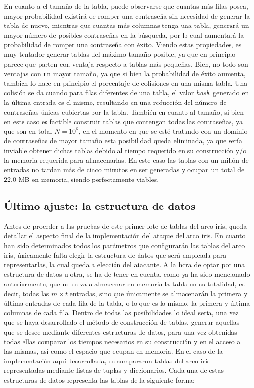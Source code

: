 \documentclass[12pt,spanish,listoffigures,listoftables,listofalgorithms]{tfgetsinf}
\newcommand{\hash}{\textit{hash}}
\begin{document}
En cuanto a el tamaño de la tabla, puede observarse que cuantas más filas posea, mayor probabilidad existirá de romper una contraseña sin necesidad de generar la tabla de nuevo, mientras que cuantas más columnas tenga una tabla, generará un mayor número de posibles contraseñas en la búsqueda, por lo cual aumentará la probabilidad de romper una contraseña con éxito. Viendo estas propiedades, es muy tentador generar tablas del máximo tamaño posible, ya que en principio parece que parten con ventaja respecto a tablas más pequeñas. Bien, no todo son ventajas con un mayor tamaño, ya que si bien la probabilidad de éxito aumenta, también lo hace en principio el porcentaje de colisiones en una misma tabla. Una colisión se da cuando para filas diferentes de una tabla, el valor \hash~generado en la última entrada es el mismo, resultando en una reducción del número de contraseñas únicas cubiertas por la tabla. También en cuanto al tamaño, si bien en este caso es factible construir tablas que contengan todas las contraseñas, ya que son en total $N = 10^6$, en el momento en que se esté tratando con un dominio de contraseñas de mayor tamaño esta posibilidad queda eliminada, ya que sería inviable obtener dichas tablas debido al tiempo requerido en su construcción y/o la memoria requerida para almacenarlas. En este caso las tablas con un millón de entradas no tardan más de cinco minutos en ser generadas y ocupan un total de 22.0 MB en memoria, siendo perfectamente viables.

\subsection{Último ajuste: la estructura de datos}

Antes de proceder a las pruebas de este primer lote de tablas del arco iris, queda detallar el aspecto final de la implementación del ataque del arco iris. En cuanto han sido determinados todos los parámetros que configurarán las tablas del arco iris, únicamente falta elegir la estructura de datos que será empleada para representarlas, la cual queda a elección del atacante. A la hora de optar por una estructura de datos u otra, se ha de tener en cuenta, como ya ha sido mencionado anteriormente, que no se va a almacenar en memoria la tabla en su totalidad, es decir, todas las $m \times t$ entradas, sino que únicamente se almacenarán la primera y última entradas de cada fila de la tabla, o lo que es lo mismo, la primera y última columnas de cada fila. Dentro de todas las posibilidades lo ideal sería, una vez que se haya desarrollado el método de construcción de tablas, generar aquellas que se desee mediante diferentes estructuras de datos, para una vez obtenidas todas ellas comparar los tiempos necesarios en su construcción y en el acceso a las mismas, así como el espacio que ocupan en memoria. En el caso de la implementación aquí desarrollada, se compararon tablas del arco iris representadas mediante listas de tuplas y diccionarios. Cada una de estas estructuras de datos representa las tablas de la siguiente forma:
\end{document}
